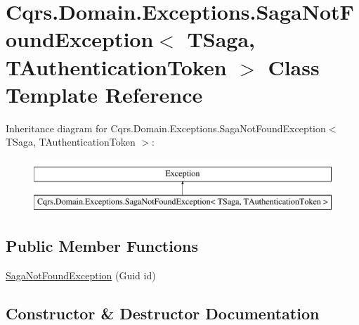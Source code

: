 \hypertarget{classCqrs_1_1Domain_1_1Exceptions_1_1SagaNotFoundException}{}\section{Cqrs.\+Domain.\+Exceptions.\+Saga\+Not\+Found\+Exception$<$ T\+Saga, T\+Authentication\+Token $>$ Class Template Reference}
\label{classCqrs_1_1Domain_1_1Exceptions_1_1SagaNotFoundException}
Inheritance diagram for Cqrs.\+Domain.\+Exceptions.\+Saga\+Not\+Found\+Exception$<$ T\+Saga, T\+Authentication\+Token $>$\+:\begin{figure}[H]
\begin{center}
\leavevmode
\includegraphics[height=2.000000cm]{classCqrs_1_1Domain_1_1Exceptions_1_1SagaNotFoundException}
\end{center}
\end{figure}
\subsection*{Public Member Functions}
\begin{DoxyCompactItemize}
\item 
\hyperlink{classCqrs_1_1Domain_1_1Exceptions_1_1SagaNotFoundException_a329725b9034ccf3167b667383fb8718a_a329725b9034ccf3167b667383fb8718a}{Saga\+Not\+Found\+Exception} (Guid id)
\end{DoxyCompactItemize}


\subsection{Constructor \& Destructor Documentation}
\mbox{\label{classCqrs_1_1Domain_1_1Exceptions_1_1SagaNotFoundException_a329725b9034ccf3167b667383fb8718a_a329725b9034ccf3167b667383fb8718a}} 
